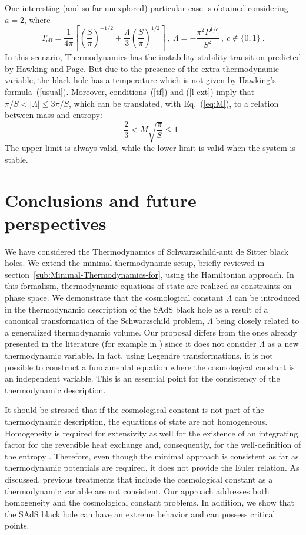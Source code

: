 \documentclass[prd,onecolumn,notitlepage,amsmath,nofootinbib,superscriptaddress,showpacs,showkeys]{revtex4-1}
\begin{document}
One interesting (and so far unexplored) particular case is obtained
considering $a=2$, where 
\begin{equation}
T_{\mathrm{eff}}=\frac{1}{4\pi}\left[\left(\frac{S}{\pi}\right)^{-1/2}+\frac{\Lambda}{3}\left(\frac{S}{\pi}\right)^{1/2}\right]~,\ 
%
\Lambda = - \frac{\pi^{2} P^{1/c}}{S^{2}}~,\ c \notin\{0,1\}~.
\end{equation}
In this scenario, Thermodynamics has the instability-stability transition predicted by Hawking and Page.
%
But due to the presence of the extra thermodynamic
variable, the black hole has a temperature which is
not given by Hawking's formula~(\ref{usual}). Moreover, conditions~(\ref{tf}) and (\ref{l-ext})
imply that $\pi/S<\left\vert \Lambda\right\vert \leq3\pi/S$, which
can be translated, with Eq.~(\ref{eq:M}), to a relation between
mass and entropy: 
\begin{equation}
\frac{2}{3}<M\sqrt{\frac{\pi}{S}}\leq1~.
\end{equation}
The upper limit is always valid, while the lower limit is valid when
the system is stable.


\section{\label{sec:Conclusions}Conclusions and future perspectives}

We have considered the Thermodynamics of Schwarzschild-anti de Sitter
black holes. We extend the minimal thermodynamic setup, briefly reviewed
in section~\ref{sub:Minimal-Thermodynamics-for}, using the Hamiltonian
approach. In this formalism, thermodynamic equations of state are
realized as constraints on phase space. We demonstrate that the cosmological
constant $\Lambda$ can be introduced in the thermodynamic description
of the SAdS black hole as a result of a canonical transformation of
the Schwarzschild problem, $\Lambda$ being closely related to a generalized
thermodynamic volume. Our proposal differs from the ones already presented
in the literature (for example in \cite{21,seki2006,29}) since it
does not consider $\Lambda$ as a new thermodynamic variable. In fact,
using Legendre transformations, it is not possible to construct a
fundamental equation where the cosmological constant is an independent
variable. This is an essential point for the consistency of the thermodynamic
description.

It should be stressed that if the cosmological constant is not part
of the thermodynamic description, the equations of state are not homogeneous.
Homogeneity is required for extensivity \cite{kastor2009} as well
for the existence of an integrating factor for the reversible heat
exchange and, consequently, for the well-definition of the entropy
\cite{bel2-2005}. Therefore, even though the minimal approach is
consistent as far as thermodynamic potentials are required, it does
not provide the Euler relation. 
%
As discussed, previous treatments that include the
cosmological constant as a thermodynamic variable are not consistent. 
Our approach addresses both homogeneity and
the cosmological constant problems. In addition, we show that the SAdS
black hole can have an extreme behavior and can possess critical points.
\end{document}
